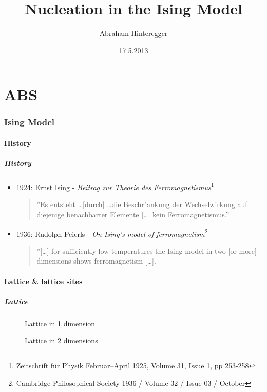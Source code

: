 \documentclass{beamer}
\newcommand{\tikzfigC}[2]{\begin{figure}[h]\begin{center}\end{center}\caption{{#2}}\end{figure}}
\begin{document}
\part{ABS}
\title{Nucleation in the Ising Model}
\author{Abraham Hinteregger}
\date{17.5.2013}
\titlepage
\setcounter{tocdepth}{4}

\section{Ising Model} 
\subsection{History}
\begin{frame}\frametitle{History} 
\begin{block}{}
\begin{itemize}%
\item 1924: \href{http://link.springer.com/content/pdf/10.1007 BF02980577.pdf}{Ernst Ising - \textit{Beitrag zur Theorie des Ferromagnetismus}\footnote{Zeitschrift für Physik Februar–April 1925, Volume 31, Issue 1, pp 253-258 }}
\begin{quote}
''Es entsteht \ldots [durch] \ldots die Beschr"ankung der Wechselwirkung auf diejenige  benachbarter Elemente [\ldots] kein Ferromagnetismus.''
\end{quote}
\item 1936: \href{http://journals.cambridge.org/action/displayAbstract?fromPage=online\&aid=2027260}{Rudolph Peierls - \textit{On Ising's model of ferromagnetism}\footnote{Cambridge Philosophical Society 1936 / Volume 32 / Issue 03 / October}}
\begin{quote}
''[\ldots] for sufficiently low temperatures the Ising model in two [or more] dimensions shows ferromagnetism [\ldots].
\end{quote}
\end{itemize}
\end{block}
\end{frame}


\subsection{Lattice \& lattice sites}
\begin{frame}\frametitle{Lattice}
\tikzfigC{Ising1D}{Lattice in 1 dimension}
\vspace*{0.25cm}
\tikzfigC{Ising2D}{Lattice in 2 dimensions}
\end{frame}
\end{document}
